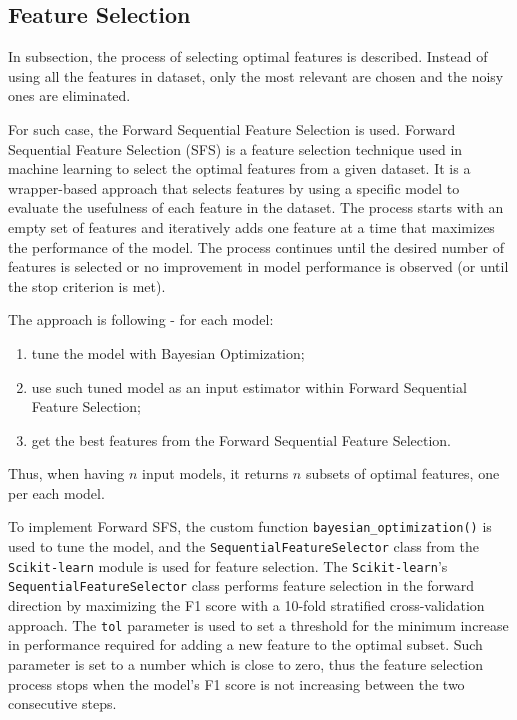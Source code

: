 \subsection{Feature Selection}
\label{subsec:feature-selection}

In subsection, the process of selecting optimal features is described. Instead of using all the features in dataset, only the most relevant are chosen and the noisy ones are eliminated.

For such case, the Forward Sequential Feature Selection is used.
Forward Sequential Feature Selection (SFS) is a feature selection technique used in machine learning to select the optimal features from a given dataset.
It is a wrapper-based approach that selects features by using a specific model to evaluate the usefulness of each feature in the dataset.
The process starts with an empty set of features and iteratively adds one feature at a time that maximizes the performance of the model.
The process continues until the desired number of features is selected or no improvement in model performance is observed (or until the stop criterion is met).

The approach is following - for each model:
\begin{enumerate}\setlength\itemsep{0em}
    \item tune the model with Bayesian Optimization;
    \item use such tuned model as an input estimator within Forward Sequential Feature Selection;
    \item get the best features from the Forward Sequential Feature Selection.
\end{enumerate}

Thus, when having $n$ input models, it returns $n$  subsets of optimal features, one per each model.

To implement Forward SFS, the custom function \lstinline{bayesian_optimization()} is used to tune the model, and the \lstinline{SequentialFeatureSelector} class from the \lstinline{Scikit-learn} module is used for feature selection.
The \lstinline{Scikit-learn}'s \lstinline{SequentialFeatureSelector} class performs feature selection in the forward direction by maximizing the F1 score with a 10-fold stratified cross-validation approach.
The \lstinline{tol} parameter is used to set a threshold for the minimum increase in performance required for adding a new feature to the optimal subset.
Such parameter is set to a number which is close to zero, thus the feature selection process stops when the model's F1 score is not increasing between the two consecutive steps.

